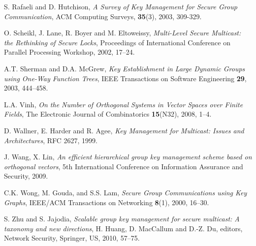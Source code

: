 \documentclass[a4paper,11pt]{amsart}
\theoremstyle{definition}
\begin{document}
\begin{thebibliography}{99}
 {\sc S. Rafaeli and D. Hutchison}, {\em A Survey of
    Key Management for Secure Group Communication}, ACM Computing
  Surveys, {\bf 35}(3), 2003, 309-329.

 {\sc O. Scheikl, J. Lane, R. Boyer and M.
    Eltoweissy}, {\em Multi-Level Secure Multicast: the Rethinking of
    Secure Locks}, Proceedings of International Conference on Parallel Processing Workshop, 2002, 17--24.



 {\sc A.T. Sherman and D.A. McGrew}, {\em Key
   Establishment in Large Dynamic Groups using One-Way Function
    Trees}, IEEE Transactions on Software Engineering {\bf 29}, 2003,
  444--458.

 {\sc L.A. Vinh}, {\em On the Number of Orthogonal
    Systems in Vector Spaces over Finite Fields}, The Electronic
  Journal of Combinatorics {\bf 15}(N32), 2008, 1--4.

 {\sc D. Wallner, E. Harder and R. Agee}, {\em Key
    Management for Multicast: Issues and Architectures}, RFC 2627,
  1999.

 {\sc J. Wang, X. Lin}, {\em An efficient hierarchical group key management 
scheme based on orthogonal vectors}, 5th International Conference on Information Assurance and Security, 2009.


 {\sc C.K. Wong, M. Gouda, and S.S. Lam}, {\em
    Secure Group Communications using Key Graphs}, IEEE/ACM
  Transactions on Networking {\bf 8}(1), 2000, 16--30.

 {\sc S. Zhu and S. Jajodia}, {\em Scalable group key management for secure
multicast: A taxonomy and new directions}, H. Huang, D. MacCallum
and D.-Z. Du, editors, Network Security, Springer, US, 2010, 57--75.








\end{thebibliography}
\end{document}
